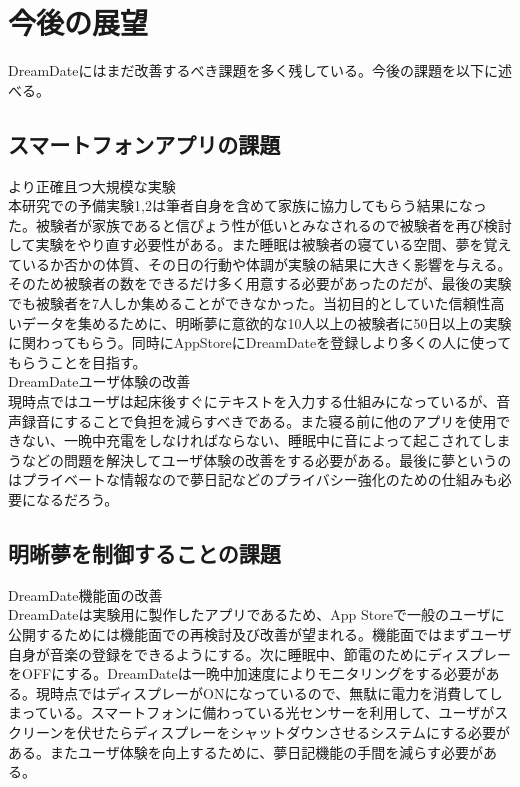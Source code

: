 \section{今後の展望}
DreamDateにはまだ改善するべき課題を多く残している。今後の課題を以下に述べる。

\subsection{スマートフォンアプリの課題}
より正確且つ大規模な実験\\
本研究での予備実験1,2は筆者自身を含めて家族に協力してもらう結果になった。被験者が家族であると信ぴょう性が低いとみなされるので被験者を再び検討して実験をやり直す必要性がある。また睡眠は被験者の寝ている空間、夢を覚えているか否かの体質、その日の行動や体調が実験の結果に大きく影響を与える。そのため被験者の数をできるだけ多く用意する必要があったのだが、最後の実験でも被験者を7人しか集めることができなかった。当初目的としていた信頼性高いデータを集めるために、明晰夢に意欲的な10人以上の被験者に50日以上の実験に関わってもらう。同時にAppStoreにDreamDateを登録しより多くの人に使ってもらうことを目指す。\\

DreamDateユーザ体験の改善\\
現時点ではユーザは起床後すぐにテキストを入力する仕組みになっているが、音声録音にすることで負担を減らすべきである。また寝る前に他のアプリを使用できない、一晩中充電をしなければならない、睡眠中に音によって起こされてしまうなどの問題を解決してユーザ体験の改善をする必要がある。最後に夢というのはプライベートな情報なので夢日記などのプライバシー強化のための仕組みも必要になるだろう。\\

\subsection{明晰夢を制御することの課題}
DreamDate機能面の改善\\
DreamDateは実験用に製作したアプリであるため、App Storeで一般のユーザに公開するためには機能面での再検討及び改善が望まれる。機能面ではまずユーザ自身が音楽の登録をできるようにする。次に睡眠中、節電のためにディスプレーをOFFにする。DreamDateは一晩中加速度によりモニタリングをする必要がある。現時点ではディスプレーがONになっているので、無駄に電力を消費してしまっている。スマートフォンに備わっている光センサーを利用して、ユーザがスクリーンを伏せたらディスプレーをシャットダウンさせるシステムにする必要がある。またユーザ体験を向上するために、夢日記機能の手間を減らす必要がある。\\

